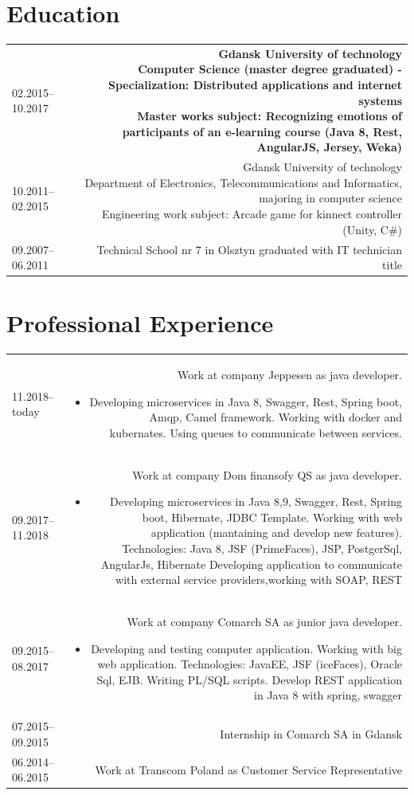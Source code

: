 \documentclass[1pt]{my_cv}
\begin{document}
	\section*{Education}
	\begin{tabular}{L!{\VRule}R}
		02.2015--10.2017&{\bf Gdansk University of technology \newline Computer Science (master degree graduated) - Specialization: Distributed applications and internet systems\newline
		\bf	Master works subject: Recognizing emotions of participants of an e-learning course (Java 8, Rest, AngularJS, Jersey, Weka)}\\[5pt]
		10.2011--02.2015&{Gdansk University of technology\newline 
			Department of  Electronics, Telecommunications and Informatics, majoring in computer science\newline
			Engineering work subject: Arcade game for kinnect controller (Unity, C\#)}\\
		09.2007--06.2011&{Technical School nr 7 in Olsztyn graduated with IT technician title}\\
	\end{tabular}
	\section*{Professional Experience}
	\begin{tabular}{L!{\VRule}R}
		11.2018--today&{Work at company Jeppesen as java developer.}
		\begin{itemize}
			\item{Developing microservices in Java 8, Swagger, Rest, Spring boot, Amqp, Camel framework.}
			{Working with docker and kubernates.}
			{Using queues to communicate between services.}
		\end{itemize}\\
		09.2017--11.2018&{Work at company Dom finansofy QS as java developer.}
			\begin{itemize}  
				\item{Developing microservices in Java 8,9, Swagger, Rest, Spring boot, Hibernate, JDBC Template.}
				{Working with web application (mantaining and develop new features). Technologies: Java 8, JSF (PrimeFaces), JSP, PostgerSql, AngularJs, Hibernate }
				{Developing application to communicate with external service providers,working with SOAP, REST}	
			\end{itemize}\\
		09.2015--08.2017&{Work at company Comarch SA as junior java developer.}
		\begin{itemize}  
			\item{Developing and testing computer application.}
			{Working with big web application. Technologies: JavaEE, JSF (iceFaces), Oracle Sql, EJB.}
			{Writing PL/SQL scripts.}			
			{Develop REST application in Java 8 with spring, swagger}
		\end{itemize}\\
		07.2015--09.2015&{Internship in Comarch SA in Gdansk}\\
		06.2014--06.2015&{Work at Transcom Poland as Customer Service Representative} 
	\end{tabular}
\end{document}
